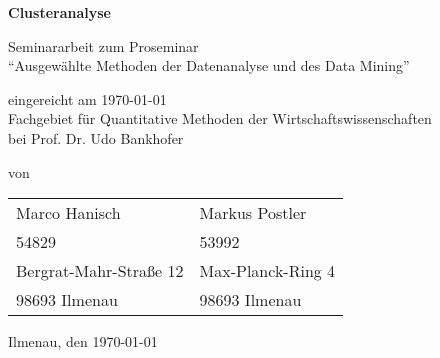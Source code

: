 \begin{titlepage}

\begin{center}
\vspace{1cm}
\large{\textbf{Clusteranalyse}}

\vspace{2cm}

\large{Seminararbeit zum Proseminar} \\ 
``Ausgewählte Methoden der Datenanalyse und des Data Mining'' \\

\vspace{4cm}

eingereicht am \today \\
Fachgebiet für Quantitative Methoden der Wirtschaftswissenschaften \\
bei Prof. Dr. Udo Bankhofer \\

\vspace{4cm}

von \\
\vspace{1cm}
\begin{tabular}{l|l}
   Marco Hanisch & Markus Postler \\ 
   54829 & 53992 \\ 
   Bergrat-Mahr-Straße 12 & Max-Planck-Ring 4 \\ 
   98693 Ilmenau & 98693 Ilmenau \\ 
 \end{tabular}

\vspace{5cm}

Ilmenau, den \today
\end{center}

\end{titlepage}
